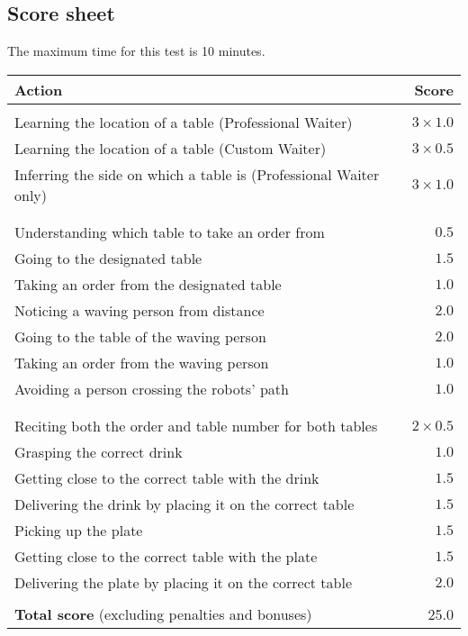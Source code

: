 

\subsection{Score sheet}
The maximum time for this test is 10 minutes.

\begin{tabularx}{\textwidth}{ X r }
	\textbf{Action} & \textbf{Score} \\ \hline
	\textbi{Training phase}  \\
	Learning the location of a table (Professional Waiter) & $3 \times 1.0$ \\
	Learning the location of a table (Custom Waiter) & $3 \times 0.5$ \\
	Inferring the side on which a table is (Professional Waiter only)& $3 \times 1.0$ \\
	\\
	\textbi{Ordering phase}  \\
	Understanding which table to take an order from & $0.5$ \\
	Going to the designated table & $1.5$ \\
	Taking an order from the designated table & $1.0$ \\
	Noticing a waving person from distance & $2.0$ \\
	Going to the table of the waving person & $2.0$ \\
	Taking an order from the waving person & $1.0$ \\
	Avoiding a person crossing the robots' path & $1.0$ \\
	\\
	\textbi{Delivering phase}  \\
	Reciting both the order and table number for both tables & $2 \times 0.5$ \\
	Grasping the correct drink & $1.0$ \\
	Getting close to the correct table with the drink & $1.5$ \\
	Delivering the drink by placing it on the correct table & $1.5$ \\
	Picking up the plate & $1.5$ \\
	Getting close to the correct table with the plate & $1.5$ \\
	Delivering the plate by placing it on the correct table & $2.0$ \\
	\\ \hline
	\textbf{Total score} (excluding penalties and bonuses) & 25.0 \\
\end{tabularx}